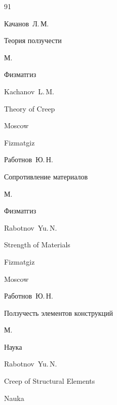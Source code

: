 \begin{thebibliography}{91}




\by Качанов~Л.\,М.

\book Теория ползучести

\publaddr М.

\publ Физматгиз



\misctransl

\by Kachanov~L.\,M.

\book Theory of Creep 

\publaddr Moscow

\publ Fizmatgiz








\by Работнов~Ю.\,Н.

\book Сопротивление материалов

\publaddr М.

\publ Физматгиз



\misctransl

\by Rabotnov~Yu.\,N.

\book Strength of Materials 

\publ Fizmatgiz

\publaddr Moscow 








\by Работнов~Ю.\,Н.

\book Ползучесть элементов конструкций

\publaddr М.

\publ Наука



\misctransl

\by Rabotnov~Yu.\,N. 

\book Creep of Structural Elements

\publ Nauka


\end{thebibliography}
